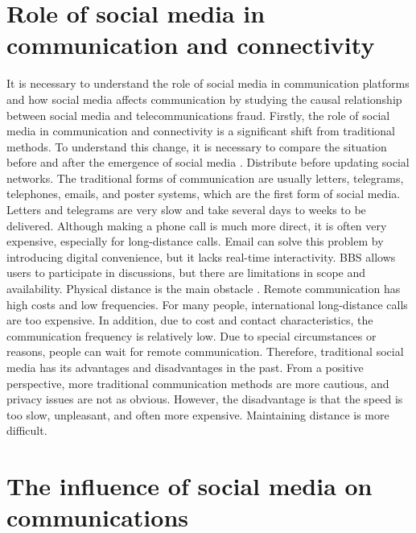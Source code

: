 \documentclass[man,floatsintext]{apa7}
\begin{document}
\section{Role of social media in communication and connectivity}

It is necessary to understand the role of social media in communication platforms and how social media affects communication by studying the causal relationship between social media and telecommunications fraud. Firstly, the role of social media in communication and connectivity is a significant shift from traditional methods. To understand this change, it is necessary to compare the situation before and after the emergence of social media \autocite{haythornthwaiteSocialNetworksInternet2005}. Distribute before updating social networks. The traditional forms of communication are usually letters, telegrams, telephones, emails, and poster systems, which are the first form of social media. Letters and telegrams are very slow and take several days to weeks to be delivered. Although making a phone call is much more direct, it is often very expensive, especially for long-distance calls. Email can solve this problem by introducing digital convenience, but it lacks real-time interactivity. BBS allows users to participate in discussions, but there are limitations in scope and availability. Physical distance is the main obstacle \autocite{jensenSpeakingSystemSocial2017}. Remote communication has high costs and low frequencies. For many people, international long-distance calls are too expensive. In addition, due to cost and contact characteristics, the communication frequency is relatively low. Due to special circumstances or reasons, people can wait for remote communication. Therefore, traditional social media has its advantages and disadvantages in the past. From a positive perspective, more traditional communication methods are more cautious, and privacy issues are not as obvious. However, the disadvantage is that the speed is too slow, unpleasant, and often more expensive. Maintaining distance is more difficult.

\section{The influence of social media on communications}
\end{document}
